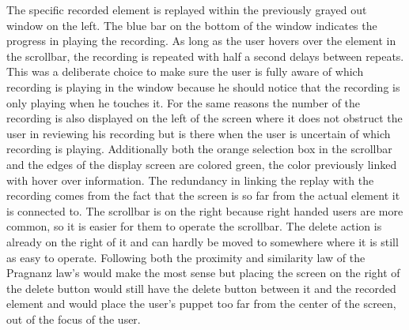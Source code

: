 The specific recorded element is replayed within the previously grayed out window on the left. The blue bar on the bottom of the window indicates the progress in playing the recording. As long as the user hovers over the element in the scrollbar, the recording is repeated with half a second delays between repeats. This was a deliberate choice to make sure the user is fully aware of which recording is playing in the window because he should notice that the recording is only playing when he touches it. For the same reasons the number of the recording is also displayed on the left of the screen where it does not obstruct the user in reviewing his recording but is there when the user is uncertain of which recording is playing. Additionally both the orange selection box in the scrollbar and the edges of the display screen are colored green, the color previously linked with hover over information. The redundancy in linking the replay with the recording comes from the fact that the screen is so far from the actual element it is connected to. The scrollbar is on the right because right handed users are more common, so it is easier for them to operate the scrollbar. The delete action is already on the right of it and can hardly be moved to somewhere where it is still as easy to operate. Following both the proximity and similarity law of the Pragnanz law's would make the most sense but placing the screen on the right of the delete button would still have the delete button between it and the recorded element and would place the user's puppet too far from the center of the screen, out of the focus of the user.\\

